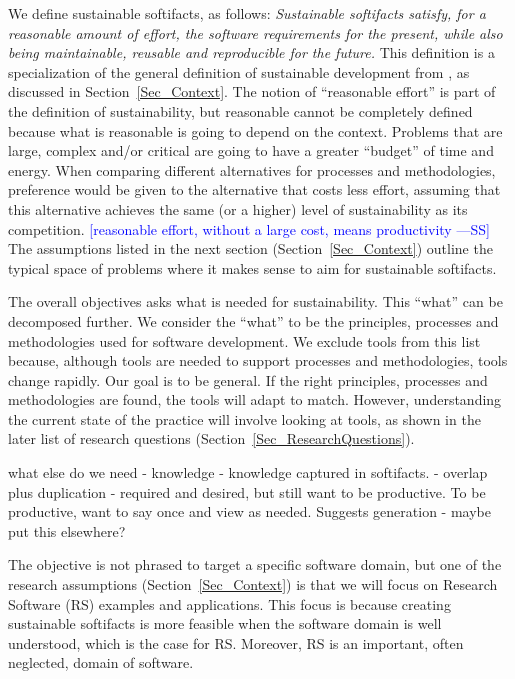 \documentclass[12pt]{article}
\newcommand{\authornote}[3]{\textcolor{#1}{[#3 ---#2]}}
\newcommand{\authornote}[3]{}
\newcommand{\wss}[1]{\authornote{blue}{SS}{#1}} %
\begin{document}
We define sustainable softifacts, as follows: \emph{Sustainable softifacts
  satisfy, for a reasonable amount of effort, the software requirements for the
  present, while also being maintainable, reusable and reproducible for the
  future.}  This definition is a specialization of the general definition of
sustainable development from \citet{Brundtland1987}, as discussed in
Section~\ref{Sec_Context}.  The notion of ``reasonable effort'' is part of the
definition of sustainability, but reasonable cannot be completely defined
because what is reasonable is going to depend on the context.  Problems that are
large, complex and/or critical are going to have a greater ``budget'' of time
and energy.  When comparing different alternatives for processes and
methodologies, preference would be given to the alternative that costs less
effort, assuming that this alternative achieves the same (or a higher) level of
sustainability as its competition.  \wss{reasonable effort, without a large
  cost, means productivity} The assumptions listed in the next section
(Section~\ref{Sec_Context}) outline the typical space of problems where it makes
sense to aim for sustainable softifacts.

The overall objectives asks what is needed for sustainability.  This ``what''
can be decomposed further.  We consider the ``what'' to be the principles,
processes and methodologies used for software development.  We exclude tools
from this list because, although tools are needed to support processes and
methodologies, tools change rapidly.  Our goal is to be general.  If the right
principles, processes and methodologies are found, the tools will adapt to
match.  However, understanding the current state of the practice will involve
looking at tools, as shown in the later list of research questions
(Section~\ref{Sec_ResearchQuestions}).

what else do we need - knowledge - knowledge captured in softifacts.  - overlap
plus duplication - required and desired, but still want to be productive.  To be
productive, want to say once and view as needed.  Suggests generation - maybe
put this elsewhere?

The objective is not phrased to target a specific software domain, but one of
the research assumptions (Section~\ref{Sec_Context}) is that we will focus on
Research Software (RS) examples and applications.  This focus is because
creating sustainable softifacts is more feasible when the software domain is
well understood, which is the case for RS.  Moreover, RS is an important,
often neglected, domain of software.
\end{document}
